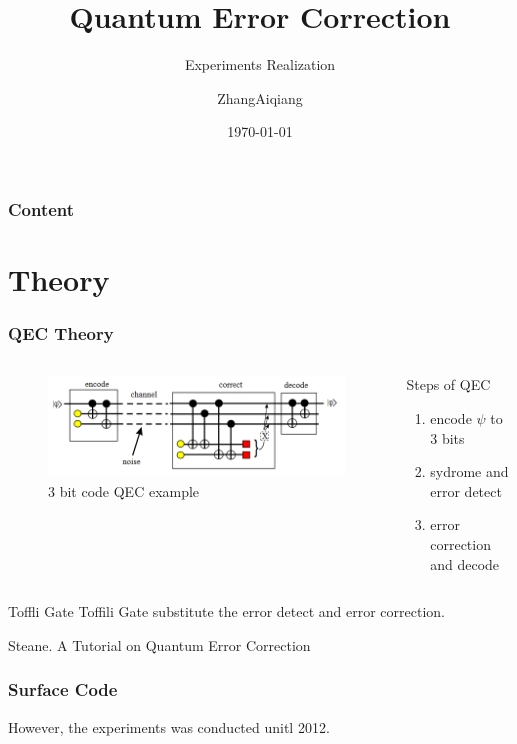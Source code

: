 \documentclass[aspectratio=169,10pt]{beamer}
\title{Quantum Error Correction}
\subtitle{Experiments Realization}
\author{ZhangAiqiang}
\institute{Tsinghua University}
\date{\today}
\begin{document}
\begin{frame}
    \titlepage
\end{frame}
\begin{frame}
    \frametitle{Content}
    \tableofcontents
\end{frame}
\section{Theory}
\begin{frame}
    \frametitle{QEC Theory}
    \begin{columns}
        \begin{column}{0.5\textwidth}
            \begin{figure}
                \includegraphics[width=\columnwidth]{figure/3bit.png}
                \caption{3 bit code QEC example}
            \end{figure}
        \end{column}
        \begin{column}{0.5\textwidth}
            \begin{block}{Steps of QEC}
            \begin{enumerate}
                \item encode $\psi$ to 3 bits
                \item sydrome and error detect
                \item error correction and decode
            \end{enumerate}
        \end{block}
        \end{column}
    \end{columns}
    \begin{block}{Toffli Gate}
        Toffili Gate substitute the error detect and error correction.    
    \end{block}
\tiny{Steane. A Tutorial on Quantum Error Correction}
\end{frame}
\begin{frame}
    \frametitle{Surface Code}
    
    However, the experiments was conducted unitl 2012.
\end{frame}
\end{document}
